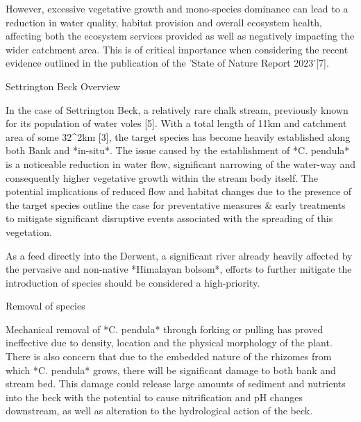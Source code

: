 However, excessive vegetative growth and mono-species dominance can lead to a reduction in water quality, habitat provision and overall ecosystem health, affecting both the ecosystem services provided as well as negatively impacting the wider catchment area. This is of critical importance when considering the recent evidence outlined in the publication of the 'State of Nature Report 2023'[7].

\newpage

\begin{center}

\Large{Settrington Beck Overview}

\end{center}




In the case of Settrington Beck, a relatively rare chalk stream, previously known for its population of water voles [5]. With a total length of 11km and catchment area of some 32^2km [3], the target species has become heavily established along both Bank and *in-situ*. The issue caused by the establishment of *C. pendula* is a noticeable reduction in water flow, significant narrowing of the water-way and consequently higher vegetative growth within the stream body itself. The potential implications of reduced flow and habitat changes due to the presence of the target species outline the case for preventative measures & early treatments to mitigate significant disruptive events associated with the spreading of this vegetation.

As a feed directly into the Derwent, a significant river already heavily affected by the pervasive and non-native *Himalayan bolsom*, efforts to further mitigate the introduction of species should be considered a high-priority. 




\begin{center}

\Large{Removal of species}

\end{center}



Mechanical removal of *C. pendula* through forking or pulling has proved ineffective  due to density, location and the physical morphology of the plant. There is also concern that due to the embedded nature of the rhizomes from which *C. pendula* grows, there will be significant damage to both bank and stream bed. This damage could release large amounts of sediment and nutrients into the beck with the potential to cause nitrification and pH changes downstream, as well as alteration to the hydrological action of the beck.

